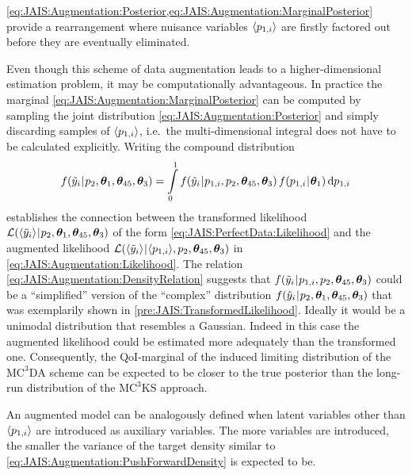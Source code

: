 \cref{eq:JAIS:Augmentation:Posterior,eq:JAIS:Augmentation:MarginalPosterior} provide a rearrangement where nuisance variables \(\langle{p_{1,i}}\rangle\) are firstly factored out before they are eventually eliminated.
\par %
Even though this scheme of data augmentation leads to a higher-dimensional estimation problem, it may be computationally advantageous.
In practice the marginal \cref{eq:JAIS:Augmentation:MarginalPosterior} can be computed by sampling the joint distribution \cref{eq:JAIS:Augmentation:Posterior} and simply discarding samples of \(\langle{p_{1,i}}\rangle\),
i.e.\ the multi-dimensional integral does not have to be calculated explicitly.
Writing the compound distribution
\begin{equation} \label{eq:JAIS:Augmentation:DensityRelation}
  f (\tilde{y}_i {\:\!}|{\:\!} p_2,\bm{\theta}_1,\bm{\theta}_{45},\bm{\theta}_3) = \int\limits_{0}^{1} f (\tilde{y}_i {\:\!}|{\:\!} p_{1,i},p_2,\bm{\theta}_{45},\bm{\theta}_3) \, f (p_{1,i} {\:\!}|{\:\!} \bm{\theta}_1) \, \mathrm{d} p_{1,i}
\end{equation}
establishes the connection between the transformed likelihood \(\mathcal{L}(\langle{\tilde{y}_i}\rangle {\:\!}|{\:\!} p_2,\bm{\theta}_1,\bm{\theta}_{45},\bm{\theta}_3)\) of the form \cref{eq:JAIS:PerfectData:Likelihood}
and the augmented likelihood \(\mathcal{L}(\langle{\tilde{y}_i}\rangle {\:\!}|{\:\!} \langle{p_{1,i}}\rangle,p_2,\bm{\theta}_{45},\bm{\theta}_3)\) in \cref{eq:JAIS:Augmentation:Likelihood}.
The relation \cref{eq:JAIS:Augmentation:DensityRelation} suggests that \(f (\tilde{y}_i {\:\!}|{\:\!} p_{1,i},p_2,\bm{\theta}_{45},\bm{\theta}_3)\) could be a ``simplified'' version of
the ``complex'' distribution \(f (\tilde{y}_i {\:\!}|{\:\!} p_2,\bm{\theta}_1,\bm{\theta}_{45},\bm{\theta}_3)\) that was exemplarily shown in \cref{pre:JAIS:TransformedLikelihood}.
Ideally it would be a unimodal distribution that resembles a Gaussian.
Indeed in this case the augmented likelihood could be estimated more adequately than the transformed one.
Consequently, the QoI-marginal of the induced limiting distribution of the \(\text{MC}^3\text{DA}\) scheme can be expected to be closer to the true posterior
than the long-run distribution of the \(\text{MC}^3\text{KS}\) approach.
\par %
An augmented model can be analogously defined when latent variables other than \(\langle{p_{1,i}}\rangle\) are introduced as auxiliary variables.
The more variables are introduced, the smaller the variance of the target density similar to \cref{eq:JAIS:Augmentation:PushForwardDensity} is expected to be.
